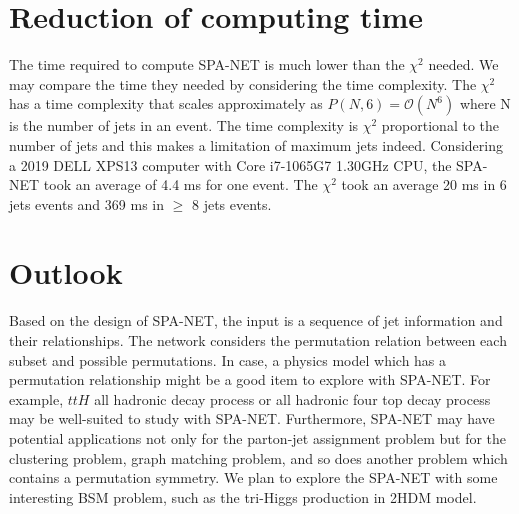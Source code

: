 \section{Reduction of computing time}\label{sec: reduce of time uasge}
The time required to compute SPA-NET is much lower than the $\chi^{2}$ needed. We may compare the time they needed by considering the time complexity. The $\chi^{2}$ has a time complexity that scales approximately as $P(N,6)=\mathcal{O}(N^{6})$ where N is the number of jets in an event. The time complexity is $\chi^{2}$ proportional to the number of jets and this makes a limitation of maximum jets indeed. Considering a 2019 DELL XPS13 computer with Core i7-1065G7 1.30GHz CPU, the SPA-NET took an average of 4.4 ms for one event.  The $\chi^{2}$ took an average 20 ms in 6 jets events and 369 ms in $\ge$ 8 jets events. 
\section{Outlook}\label{sec:outlook}
Based on the design of SPA-NET, the input is a sequence of jet information and their relationships. The network considers the permutation relation between each subset and possible permutations. In case, a physics model which has a permutation relationship might be a good item to explore with SPA-NET. For example, $ttH$ all hadronic decay process or all hadronic four top decay process may be well-suited to study with SPA-NET. Furthermore, SPA-NET may have potential applications not only for the parton-jet assignment problem but for the clustering problem, graph matching problem, and so does another problem which contains a permutation symmetry. We plan to explore the SPA-NET with some interesting BSM problem, such as the tri-Higgs production in 2HDM model.\cite{Low:2020iua}



